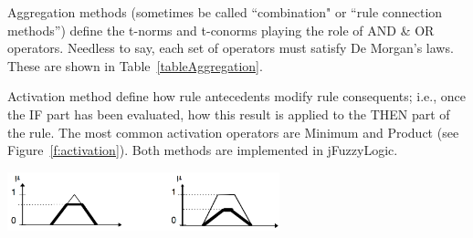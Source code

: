 \documentclass[11pt,twoside]{article}
\begin{document}
\begin{multicols}{2}
Aggregation methods (sometimes be called ``combination" or ``rule connection methods'') define the t-norms and t-conorms playing the role of AND \& OR operators. Needless to say, each set of operators must satisfy De Morgan's laws. These are shown in Table~\ref{tableAggregation}.
\vspace*{5pt}
\label{tableAggregation}
\centerline{
}
\vspace*{10pt}

Activation method define how rule antecedents modify rule consequents; i.e., once the IF part has been evaluated, how this result is applied to the THEN part of the rule.  
The most common activation operators are Minimum and Product (see Figure~\ref{f:activation}).
Both methods are implemented in jFuzzyLogic.

\vspace*{5pt}
\centerline{\includegraphics[width=3.1in]{./figs/MaxProd.png}}
\vspace*{3pt}
\label{f:activation}
\vspace*{5pt}


\end{multicols}
\end{document}
